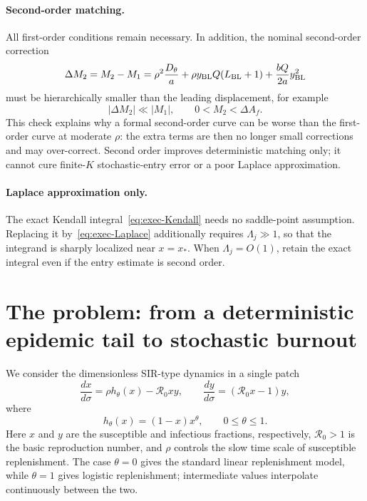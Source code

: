 \documentclass[11pt,a4paper]{article}
\newcommand{\Rzero}{\mathcal R_0}
\newcommand{\BL}{y_{\rm BL}}
\newcommand{\xs}{x_*}
\begin{document}
\paragraph{Second-order matching.}
All first-order conditions remain necessary.  In addition, the nominal
second-order correction
\begin{equation}
 \Delta M_2=M_2-M_1
 =\rho^2\frac{D_\theta}{a}+\rho\BL Q(L_{\rm BL}+1)
 +\frac{bQ}{2a}\BL^2
\end{equation}
must be hierarchically smaller than the leading displacement, for example
\begin{equation}
 |\Delta M_2|\ll |M_1|,
 \qquad 0<M_2<\Delta A_f.
 \label{eq:exec-second-cond}
\end{equation}
This check explains why a formal second-order curve can be worse than the
first-order curve at moderate $\rho$: the extra terms are then no longer small
corrections and may over-correct.  Second order improves deterministic matching
only; it cannot cure finite-$K$ stochastic-entry error or a poor Laplace
approximation.

\paragraph{Laplace approximation only.}
The exact Kendall integral~\eqref{eq:exec-Kendall} needs no saddle-point
assumption.  Replacing it by~\eqref{eq:exec-Laplace} additionally requires
$\Lambda_j\gg1$, so that the integrand is sharply localized near $x=\xs$.
When $\Lambda_j=O(1)$, retain the exact integral even if the entry estimate is
second order.

\section{The problem: from a deterministic epidemic tail to stochastic burnout}
We consider the dimensionless SIR-type dynamics in a single patch
\begin{equation}
\label{eq:model}
\frac{dx}{d\sigma}=\rho h_\theta(x)-\Rzero xy,
\qquad
\frac{dy}{d\sigma}=(\Rzero x-1)y,
\end{equation}
where
\begin{equation}
\label{eq:h}
h_\theta(x)=(1-x)x^\theta,
\qquad 0\leq\theta\leq1.
\end{equation}
Here $x$ and $y$ are the susceptible and infectious fractions, respectively, $\Rzero>1$ is the basic reproduction number, and $\rho$ controls the slow time scale of susceptible replenishment. The case $\theta=0$ gives the standard linear replenishment model, while $\theta=1$ gives logistic replenishment; intermediate values interpolate continuously between the two.
\end{document}

